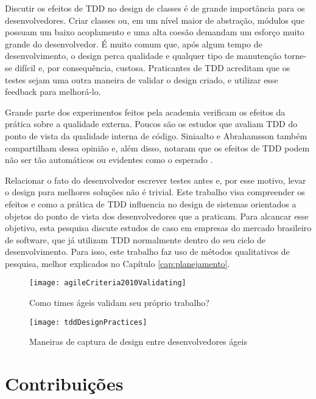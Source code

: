 Discutir os efeitos de TDD no design de classes é de grande importância para os
desenvolvedores.
Criar classes ou, em um nível maior de abstração, módulos que possuam um baixo
acoplamento e uma alta coesão demandam um esforço muito grande do desenvolvedor. 
É muito comum que, após algum tempo de desenvolvimento, o design perca qualidade
e qualquer tipo de manutenção torne-se difícil e, por consequência, custosa.
Praticantes de TDD acreditam que os testes sejam uma outra maneira
de validar o design criado, e utilizar esse feedback para melhorá-lo.

Grande parte dos experimentos feitos pela academia verificam os efeitos da
prática sobre a qualidade externa. Poucos são os estudos que avaliam TDD do
ponto de vista da qualidade interna de código. Siniaalto e Abrahamsson também 
compartilham dessa opinião e, além disso, notaram que os efeitos de TDD podem 
não ser tão automáticos ou evidentes como o esperado \cite{alarming-results}.

Relacionar o fato do desenvolvedor escrever testes antes e, por esse motivo,
levar o design para melhores soluções não é trivial.
Este trabalho visa compreender os efeitos e como a prática de TDD
influencia no design de sistemas orientados a objetos do ponto de vista dos
desenvolvedores que a praticam. Para alcancar esse objetivo,
esta pesquisa discute estudos de caso em empresas do mercado brasileiro de
software, que já utilizam TDD normalmente dentro do seu ciclo de
desenvolvimento. Para isso, este trabalho faz uso de métodos qualitativos de
pesquisa, melhor explicados no Capítulo \ref{cap:planejamento}.

\begin{figure}[ht]
  \begin{minipage}[b]{0.45\linewidth}
    \centering
    \texttt{[image: agileCriteria2010Validating]}
    \caption{Como times ágeis validam seu próprio trabalho?}
    \label{fig:wambler-agile-2010}
  \end{minipage}
  \hspace{0.5cm}
  \begin{minipage}[b]{0.45\linewidth}
    \centering
    \texttt{[image: tddDesignPractices]}
    \caption{Maneiras de captura de design entre desenvolvedores ágeis}  
    \label{fig:wambler-tdd-2008}
  \end{minipage}
\end{figure}			

\section{Contribuições}

